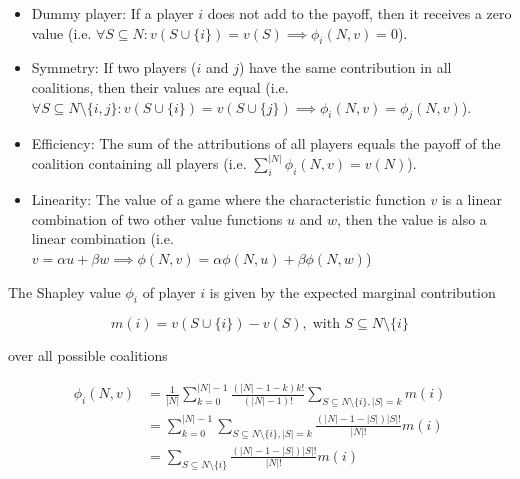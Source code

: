 \begin{itemize}
	\item Dummy player: If a player $i$ does not add to the payoff, then it receives a
	      zero value (i.e. $\forall S \subseteq N: v(S \cup \{i\}) = v(S) \implies \phi_i(N, v) = 0$).

	\item Symmetry: If two players ($i$ and $j$) have the same contribution in all coalitions, then
	      their values are equal (i.e. $\forall S \subseteq N \setminus \{i, j\}: v(S \cup \{i\}) = v(S \cup \{j\}) \implies \phi_i(N, v) = \phi_j(N, v)$).

	\item Efficiency: The sum of the attributions of all players equals the payoff of the coalition containing
	      all players (i.e. $\sum^{|N|}_i \phi_i(N, v) = v(N)$).

	\item Linearity: The value of a game where the characteristic function $v$ is a linear combination of
	      two other value functions $u$ and $w$, then the value is also a linear combination (i.e.
	      $v = \alpha u + \beta w \implies \phi(N, v) = \alpha \phi(N, u) + \beta \phi(N, w)$)
\end{itemize}


The Shapley value $\phi_i$ of player $i$ is given by the expected marginal contribution\cite{zhang2022gstarx}


\begin{equation}
	m(i) = v\left(S \cup \{i\}\right) - v\left(S\right), \; \text{with } S \subseteq N \setminus \{i\}
\end{equation}


over all possible coalitions


\begin{equation}
	\begin{aligned}
		\label{eq:Shapley}
		\phi_i(N, v) & = \frac{1}{|N|} \sum_{k=0}^{|N|-1} \frac{\left(|N| - 1 - k\right)k!}{\left(|N| - 1\right)!} \sum_{S \subseteq N \setminus \{i\}, |S| = k} m(i) \\
		             & = \sum_{k=0}^{|N| - 1} \sum_{S \subseteq N \setminus \{i\}, |S| = k} \frac{\left(|N| - 1 - |S|\right)|S|!}{|N|!} m(i)                          \\
		             & = \sum_{S \subseteq N \setminus \{i\}} \frac{\left(|N| - 1 - |S|\right)|S|!}{|N|!} m(i)
	\end{aligned}
\end{equation}


